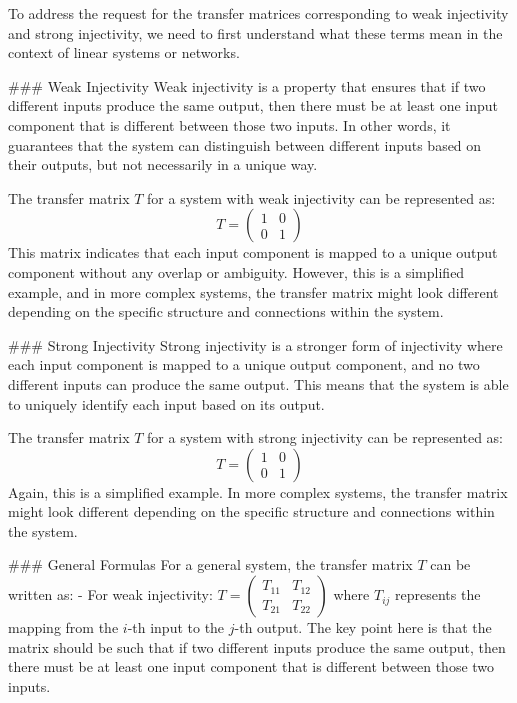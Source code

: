 To address the request for the transfer matrices corresponding to weak injectivity and strong injectivity, we need to first understand what these terms mean in the context of linear systems or networks.

### Weak Injectivity
Weak injectivity is a property that ensures that if two different inputs produce the same output, then there must be at least one input component that is different between those two inputs. In other words, it guarantees that the system can distinguish between different inputs based on their outputs, but not necessarily in a unique way.

The transfer matrix \( T \) for a system with weak injectivity can be represented as:
\[ T = \begin{pmatrix}
1 & 0 \\
0 & 1
\end{pmatrix} \]
This matrix indicates that each input component is mapped to a unique output component without any overlap or ambiguity. However, this is a simplified example, and in more complex systems, the transfer matrix might look different depending on the specific structure and connections within the system.

### Strong Injectivity
Strong injectivity is a stronger form of injectivity where each input component is mapped to a unique output component, and no two different inputs can produce the same output. This means that the system is able to uniquely identify each input based on its output.

The transfer matrix \( T \) for a system with strong injectivity can be represented as:
\[ T = \begin{pmatrix}
1 & 0 \\
0 & 1
\end{pmatrix} \]
Again, this is a simplified example. In more complex systems, the transfer matrix might look different depending on the specific structure and connections within the system.

### General Formulas
For a general system, the transfer matrix \( T \) can be written as:
- For weak injectivity: \( T = \begin{pmatrix}
T_{11} & T_{12} \\
T_{21} & T_{22}
\end{pmatrix} \)
where \( T_{ij} \) represents the mapping from the \( i \)-th input to the \( j \)-th output. The key point here is that the matrix should be such that if two different inputs produce the same output, then there must be at least one input component that is different between those two inputs.

